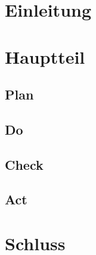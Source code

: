 
\section{Einleitung}

\section{Hauptteil}

\subsection{Plan}
\subsection{Do}
\subsection{Check}
\subsection{Act}

\section{Schluss}


\nocite{GitHubGettingStartedHubot}
\nocite{BotkitBotkitToolkitbuilding}
\nocite{SlackConversationsAPI}
